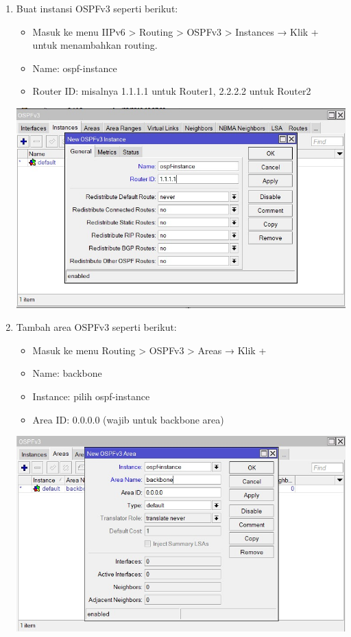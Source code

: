 \begin{enumerate}
\begin{enumerate}
        \item Buat instansi OSPFv3 seperti berikut:
        \begin{itemize}
            \item Masuk ke menu IIPv6 > Routing > OSPFv3 > Instances → Klik + untuk menambahkan routing.
            \item Name: ospf-instance
            \item Router ID: misalnya 1.1.1.1 untuk Router1, 2.2.2.2 untuk Router2
        \end{itemize}
        
        \includegraphics[scale=0.5]{P1/img/13.jpg}

        \item Tambah area OSPFv3 seperti berikut:
        \begin{itemize}
            \item Masuk ke menu Routing > OSPFv3 > Areas → Klik +
            \item Name: backbone
            \item Instance: pilih ospf-instance
            \item Area ID: 0.0.0.0 (wajib untuk backbone area)
        \end{itemize}

        \includegraphics[scale=0.5]{P1/img/14.jpg}


\end{enumerate}
\end{enumerate}
